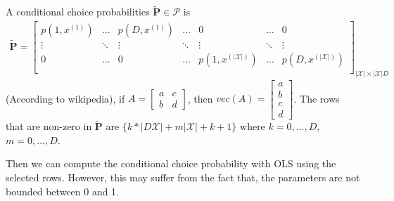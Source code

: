 \documentclass{article}
\def\bs{\boldsymbol}
\begin{document}
A conditional choice probabilities $\tilde{\bs{P}} \in \mathcal{P}$ is \[ \begin{split}
  \tilde{\bs{P}} = \begin{bmatrix}
 p(1,x^{(1)}) & \ldots & p(D,x^{(1)}) &\ldots & 0 &\ldots &  0  \\
 \vdots & \ddots & \vdots & \ddots & \vdots & \ddots & \vdots \\
 0 & \ldots & 0 & \ldots & p(1,x^{(|\mathcal{X}|)}) & \ldots & p(D,x^{(|\mathcal{X}|)}) \\
  \end{bmatrix}_{|\mathcal{X}| \times |\mathcal{X}|D}
\end{split} \]
(According to wikipedia), if $A=\begin{bmatrix} a & c \\ b & d  \end{bmatrix}$, then $vec(A) = \begin{bmatrix}
  a \\ b \\ c \\ d
\end{bmatrix}$.
The rows that are non-zero in $\tilde{\bs{P}}$ are $\{ k * |D \mathcal{X}| + m |\mathcal{X}| + k + 1 \}$ where $k=0,\ldots,D$,$m=0,\ldots,D$.

Then we can compute the conditional choice probability with OLS using the selected rows.
However, this may suffer from the fact that, the parameters are not bounded between 0 and 1.


\end{document}
